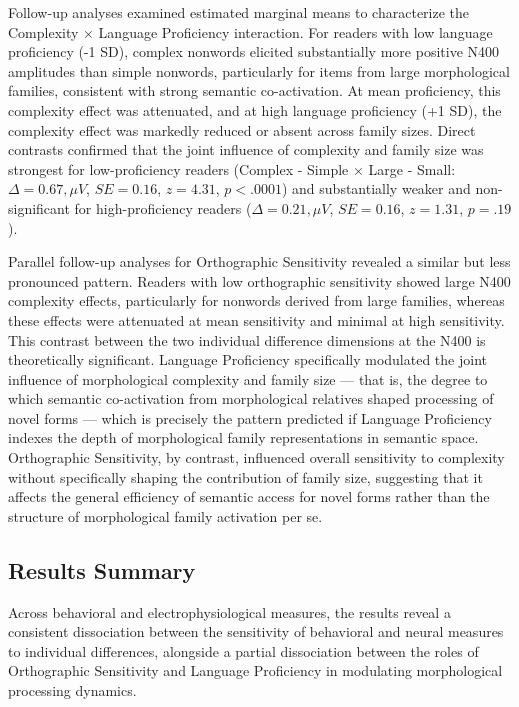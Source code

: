 Follow-up analyses examined estimated marginal means to characterize the Complexity × Language Proficiency interaction. For readers with low language proficiency (-1 SD), complex nonwords elicited substantially more positive N400 amplitudes than simple nonwords, particularly for items from large morphological families, consistent with strong semantic co-activation. At mean proficiency, this complexity effect was attenuated, and at high language proficiency (+1 SD), the complexity effect was markedly reduced or absent across family sizes. Direct contrasts confirmed that the joint influence of complexity and family size was strongest for low-proficiency readers (Complex - Simple × Large - Small: $\Delta = 0.67,\mu V$, $SE = 0.16$, $z = 4.31$, $p < .0001$) and substantially weaker and non-significant for high-proficiency readers ($\Delta = 0.21,\mu V$, $SE = 0.16$, $z = 1.31$, $p = .19$).

Parallel follow-up analyses for Orthographic Sensitivity revealed a similar but less pronounced pattern. Readers with low orthographic sensitivity showed large N400 complexity effects, particularly for nonwords derived from large families, whereas these effects were attenuated at mean sensitivity and minimal at high sensitivity. This contrast between the two individual difference dimensions at the N400 is theoretically significant. Language Proficiency specifically modulated the joint influence of morphological complexity and family size — that is, the degree to which semantic co-activation from morphological relatives shaped processing of novel forms — which is precisely the pattern predicted if Language Proficiency indexes the depth of morphological family representations in semantic space. Orthographic Sensitivity, by contrast, influenced overall sensitivity to complexity without specifically shaping the contribution of family size, suggesting that it affects the general efficiency of semantic access for novel forms rather than the structure of morphological family activation per se.

\subsection{Results Summary}
Across behavioral and electrophysiological measures, the results reveal a consistent dissociation between the sensitivity of behavioral and neural measures to individual differences, alongside a partial dissociation between the roles of Orthographic Sensitivity and Language Proficiency in modulating morphological processing dynamics.

